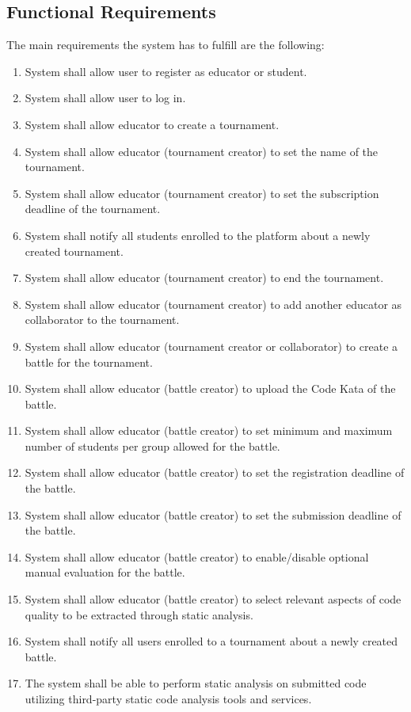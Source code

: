 \subsection{Functional Requirements}
The main requirements the system has to fulfill are the following:
\begin{enumerate}[label=$\bullet$ \textbf{R\arabic*:}]
    \item System shall allow user to register as educator or student.
    \item System shall allow user to log in.
    \item System shall allow educator to create a tournament.
    \item System shall allow educator (tournament creator) to set the name of the tournament.
    \item System shall allow educator (tournament creator) to set the subscription deadline of the tournament.
    \item System shall notify all students enrolled to the platform about a newly created tournament.
    \item System shall allow educator (tournament creator) to end the tournament.
    \item System shall allow educator (tournament creator) to add another educator as collaborator to the tournament.
    \item System shall allow educator (tournament creator or collaborator) to create a battle for the tournament.
    \item System shall allow educator (battle creator) to upload the Code Kata of the battle.
    \item System shall allow educator (battle creator) to set minimum and maximum number of students per group allowed for the battle.
    \item System shall allow educator (battle creator) to set the registration deadline of the battle.
    \item System shall allow educator (battle creator) to set the submission deadline of the battle.
    \item System shall allow educator (battle creator) to enable/disable optional manual evaluation for the battle.
    \item System shall allow educator (battle creator) to select relevant aspects of code quality to be extracted through static analysis.
    \item System shall notify all users enrolled to a tournament about a newly created battle.
    \item The system shall be able to perform static analysis on submitted code utilizing third-party static code analysis tools and services.

\end{enumerate}
